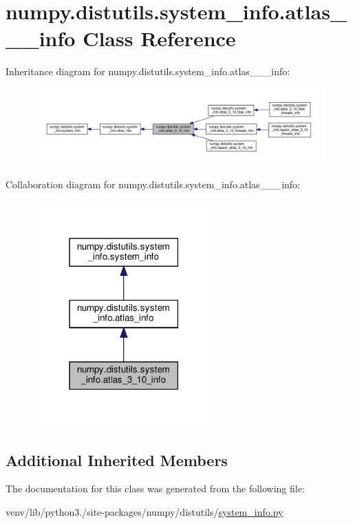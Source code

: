 \hypertarget{classnumpy_1_1distutils_1_1system__info_1_1atlas__3__10__info}{}\section{numpy.\+distutils.\+system\+\_\+info.\+atlas\+\_\+\_\+\_\+info Class Reference}
\label{classnumpy_1_1distutils_1_1system__info_1_1atlas__3__10__info}


Inheritance diagram for numpy.\+distutils.\+system\+\_\+info.\+atlas\+\_\+\_\+\_\+info\+:
\nopagebreak
\begin{figure}[H]
\begin{center}
\leavevmode
\includegraphics[width=350pt]{classnumpy_1_1distutils_1_1system__info_1_1atlas__3__10__info__inherit__graph}
\end{center}
\end{figure}


Collaboration diagram for numpy.\+distutils.\+system\+\_\+info.\+atlas\+\_\+\_\+\_\+info\+:
\nopagebreak
\begin{figure}[H]
\begin{center}
\leavevmode
\includegraphics[width=198pt]{classnumpy_1_1distutils_1_1system__info_1_1atlas__3__10__info__coll__graph}
\end{center}
\end{figure}
\subsection*{Additional Inherited Members}


The documentation for this class was generated from the following file\+:\begin{DoxyCompactItemize}
\item 
venv/lib/python3./site-\/packages/numpy/distutils/\hyperlink{system__info_8py}{system\+\_\+info.\+py}\end{DoxyCompactItemize}
